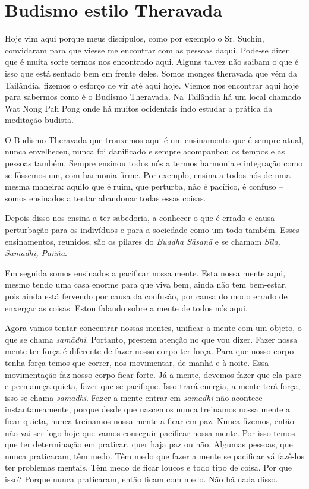 
\chapter{Budismo estilo Theravada}
\markright{\theChapterAuthor}

Hoje vim aqui porque meus discípulos, como por exemplo o Sr. Suchin,
convidaram para que viesse me encontrar com as pessoas daqui. Pode-se
dizer que é muita sorte termos nos encontrado aqui. Alguns talvez não
saibam o que é isso que está sentado bem em frente deles. Somos monges
theravada que vêm da Tailândia, fizemos o esforço de vir até aqui hoje.
Viemos nos encontrar aqui hoje para sabermos como é o Budismo
Theravada. Na Tailândia há um local chamado Wat Nong Pah Pong onde há
muitos ocidentais indo estudar a prática da meditação budista. 

O Budismo Theravada que trouxemos aqui é um ensinamento que é sempre
atual, nunca envelheceu, nunca foi danificado e sempre acompanhou os
tempos e as pessoas também. Sempre ensinou todos nós a termos harmonia
e integração como se fôssemos um, com harmonia firme. Por exemplo,
ensina a todos nós de uma mesma maneira: aquilo que é ruim, que
perturba, não é pacífico, é confuso – somos ensinados a tentar
abandonar todas essas coisas. 

Depois disso nos ensina a ter sabedoria, a conhecer o que é errado e
causa perturbação para os indivíduos e para a sociedade como um todo
também. Esses ensinamentos, reunidos, são os pilares do \emph{Buddha
Sāsanā} e se chamam \emph{Sīla, Samādhi, Paññā}.

Em seguida somos ensinados a pacificar nossa mente. Esta nossa mente
aqui, mesmo tendo uma casa enorme para que viva bem, ainda não tem
bem-estar, pois ainda está fervendo por causa da confusão, por causa do
modo errado de enxergar as coisas. Estou falando sobre a mente de todos
nós aqui.

Agora vamos tentar concentrar nossas mentes, unificar a mente com um
objeto, o que se chama \emph{samādhi}. Portanto, prestem atenção no
que vou dizer. Fazer nossa mente ter força é diferente de fazer nosso
corpo ter força. Para que nosso corpo tenha força temos que correr, nos
movimentar, de manhã e à noite. Essa movimentação faz nosso corpo ficar
forte. Já a mente, devemos fazer que ela pare e permaneça quieta, fazer
que se pacifique. Isso trará energia, a mente terá força, isso se chama
\emph{samādhi}. Fazer a mente entrar em \emph{samādhi} não
acontece instantaneamente, porque desde que nascemos nunca treinamos
nossa mente a ficar quieta, nunca treinamos nossa mente a ficar em paz.
Nunca fizemos, então não vai ser logo hoje que vamos conseguir
pacificar nossa mente. Por isso temos que ter determinação em praticar,
quer haja paz ou não. Algumas pessoas, que nunca praticaram, têm medo.
Têm medo que fazer a mente se pacificar vá fazê-los ter problemas
mentais. Têm medo de ficar loucos e todo tipo de coisa. Por que isso?
Porque nunca praticaram, então ficam com medo. Não há nada disso. 

